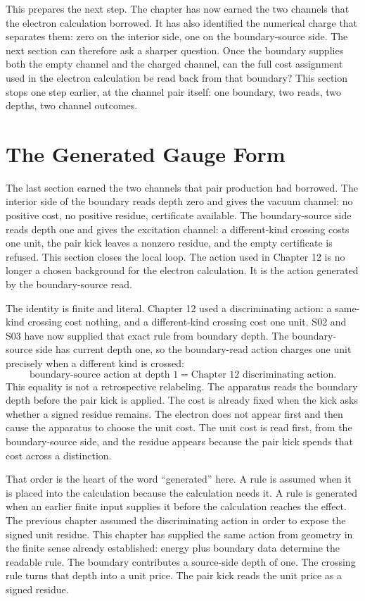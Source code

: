 This prepares the next step. The chapter has now earned the two channels that the
electron calculation borrowed. It has also identified the numerical charge that
separates them: zero on the interior side, one on the boundary-source side. The next
section can therefore ask a sharper question. Once the boundary supplies both the
empty channel and the charged channel, can the full cost assignment used in the
electron calculation be read back from that boundary? This section stops one step
earlier, at the channel pair itself: one boundary, two reads, two depths, two channel
outcomes.

\section{The Generated Gauge Form}

The last section earned the two channels that pair production had borrowed. The
interior side of the boundary reads depth zero and gives the vacuum channel: no
positive cost, no positive residue, certificate available. The boundary-source side
reads depth one and gives the excitation channel: a different-kind crossing costs one
unit, the pair kick leaves a nonzero residue, and the empty certificate is refused.
This section closes the local loop. The action used in Chapter 12 is no longer a
chosen background for the electron calculation. It is the action generated by the
boundary-source read.

The identity is finite and literal. Chapter 12 used a discriminating action: a
same-kind crossing cost nothing, and a different-kind crossing cost one unit. S02
and S03 have now supplied that exact rule from boundary depth. The boundary-source
side has current depth one, so the boundary-read action charges one unit precisely
when a different kind is crossed:
\[
  \text{boundary-source action at depth } 1
  =
  \text{Chapter 12 discriminating action}.
\]
This equality is not a retrospective relabeling. The apparatus reads the boundary
depth before the pair kick is applied. The cost is already fixed when the kick asks
whether a signed residue remains. The electron does not appear first and then cause
the apparatus to choose the unit cost. The unit cost is read first, from the
boundary-source side, and the residue appears because the pair kick spends that
cost across a distinction.

That order is the heart of the word ``generated'' here. A rule is assumed when it is
placed into the calculation because the calculation needs it. A rule is generated
when an earlier finite input supplies it before the calculation reaches the effect.
The previous chapter assumed the discriminating action in order to expose the signed
unit residue. This chapter has supplied the same action from geometry in the finite
sense already established: energy plus boundary data determine the readable rule.
The boundary contributes a source-side depth of one. The crossing rule turns that
depth into a unit price. The pair kick reads the unit price as a signed residue.

